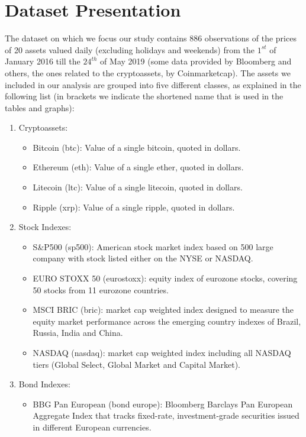 \section{Dataset  Presentation}
\bigskip
The dataset on which we focus our study contains 886 observations of the prices of 20 assets valued daily (excluding holidays and weekends) from the $1^{st}$ of January 2016 till the $24^{th}$ of May 2019 (some data provided by Bloomberg and others, the ones related to the cryptoassets, by Coinmarketcap).
The assets we included in our analysis are grouped into five different classes, as explained in the following list (in brackets we indicate the shortened name that is used in the tables and graphs):
\begin{enumerate}
    \item Cryptoassets:
    \begin{itemize}
        \item Bitcoin (btc): Value of a single bitcoin, quoted in dollars.
        \item Ethereum (eth): Value of a single ether, quoted in dollars.
        \item Litecoin (ltc): Value of a single litecoin, quoted in dollars.
        \item Ripple (xrp): Value of a single ripple, quoted in dollars.
    \end{itemize}
    \item Stock Indexes:
    \begin{itemize}
        \item S\&P500 (sp500): American stock market index based on 500 large company with stock listed either on the NYSE or NASDAQ.
        \item EURO STOXX 50 (eurostoxx): equity index of eurozone stocks, covering 50 stocks from 11 eurozone countries.
        \item MSCI BRIC (bric): market cap weighted index designed to measure the equity market performance across the emerging country indexes of Brazil, Russia, India and China.
        \item NASDAQ (nasdaq): market cap weighted index including all NASDAQ tiers (Global Select, Global Market and Capital Market).
    \end{itemize}
    \item Bond Indexes:
    \begin{itemize}
        \item BBG Pan European (bond europe): Bloomberg Barclays Pan European Aggregate Index that tracks fixed-rate, investment-grade securities issued in different European currencies.

\end{itemize}
\end{enumerate}
